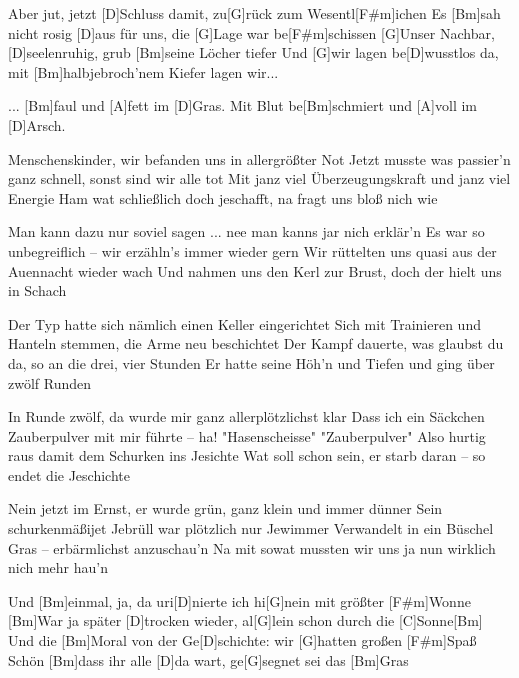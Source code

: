 \begin{spacing}{0.99}
\begin{guitar}
	[Bm]Aber jut, jetzt [D]Schluss damit, zu[G]rück zum Wesentl[F#m]ichen
	Es [Bm]sah nicht rosig [D]aus für uns, die [G]Lage war be[F#m]schissen
	[G]Unser Nachbar, [D]seelenruhig, grub [Bm]seine Löcher tiefer
	Und [G]wir lagen be[D]wusstlos da, mit [Bm]halbjebroch'nem Kiefer lagen wir...
	
	\begin{highlightbar}
		... [Bm]faul und [A]fett im [D]Gras.
		Mit Blut be[Bm]schmiert und [A]voll im [D]Arsch.
	\end{highlightbar}
	
	Menschenskinder, wir befanden uns in allergrößter Not
	Jetzt musste was passier'n ganz schnell, sonst sind wir alle tot
	Mit janz viel Überzeugungskraft und janz viel Energie
	Ham wat schließlich doch jeschafft, na fragt uns bloß nich wie
	
	Man kann dazu nur soviel sagen ... nee man kanns jar nich erklär'n
	Es war so unbegreiflich – wir erzähln's immer wieder gern
	Wir rüttelten uns quasi aus der Auennacht wieder wach
	Und nahmen uns den Kerl zur Brust, doch der hielt uns in Schach
	
	Der Typ hatte sich nämlich einen Keller eingerichtet
	Sich mit Trainieren und Hanteln stemmen, die Arme neu beschichtet
	Der Kampf dauerte, was glaubst du da, so an die drei, vier Stunden
	Er hatte seine Höh'n und Tiefen und ging über zwölf Runden
	
	In Runde zwölf, da wurde mir ganz allerplötzlichst klar
	Dass ich ein Säckchen Zauberpulver mit mir führte – ha!
	"Hasenscheisse" "Zauberpulver"
	Also hurtig raus damit dem Schurken ins Jesichte
	Wat soll schon sein, er starb daran – so endet die Jeschichte
	
	Nein jetzt im Ernst, er wurde grün, ganz klein und immer dünner
	Sein schurkenmäßijet Jebrüll war plötzlich nur Jewimmer
	Verwandelt in ein Büschel Gras – erbärmlichst anzuschau'n
	Na mit sowat mussten wir uns ja nun wirklich nich mehr hau'n
	
	Und [Bm]einmal, ja, da uri[D]nierte ich hi[G]nein mit größter [F#m]Wonne
	[Bm]War ja später [D]trocken wieder, al[G]lein schon durch die [C]Sonne[Bm]{}
	Und die [Bm]Moral von der Ge[D]schichte: wir [G]hatten großen [F#m]Spaß
	Schön [Bm]dass ihr alle [D]da wart, ge[G]segnet sei das [Bm]Gras
\end{guitar}
\end{spacing}
